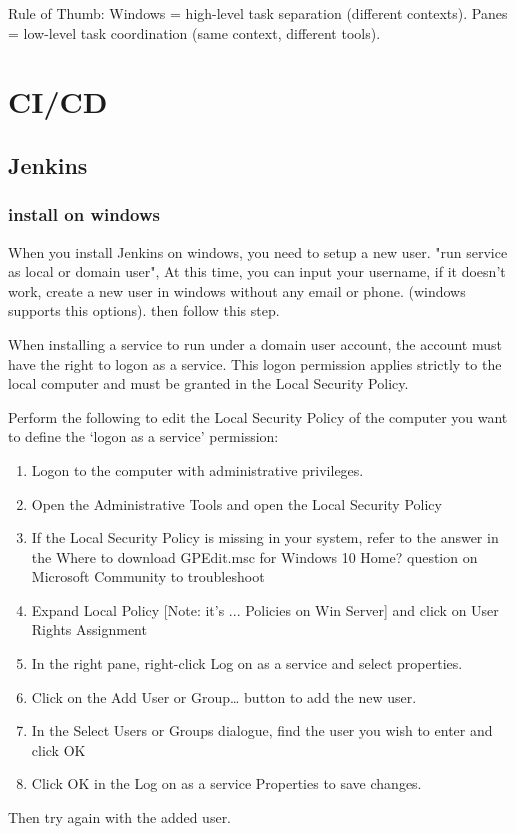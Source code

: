 \documentclass[paper=8.5in:11in, twoside, 12pt, pagesize=pdftex]{book}
\begin{document}
Rule of Thumb:
Windows = high-level task separation (different contexts). Panes = low-level task coordination (same context, different tools).


\section{CI/CD}
\subsection{Jenkins}

\subsubsection{install on windows}

When you install Jenkins on windows, you need to setup a new user. 
"run service as local or domain user", At this time, you can input your username, if it doesn't work, create a new user in windows without any email or phone. (windows supports this options). then follow this step. 


When installing a service to run under a domain user account, the account must have the right to logon as a service. This logon permission applies strictly to the local computer and must be granted in the Local Security Policy.

Perform the following to edit the Local Security Policy of the computer you want to define the ‘logon as a service’ permission:


\begin{enumerate}
	\item Logon to the computer with administrative privileges.
	
	\item Open the Administrative Tools and open the Local Security Policy
	
	\item If the Local Security Policy is missing in your system, refer to the answer in the Where to download GPEdit.msc for Windows 10 Home? question on Microsoft Community to troubleshoot
	
	\item Expand Local Policy [Note: it's ... Policies on Win Server] and click on User Rights Assignment
	
	\item In the right pane, right-click Log on as a service and select properties.
	\item Click on the Add User or Group… button to add the new user.
	
	\item In the Select Users or Groups dialogue, find the user you wish to enter and click OK
	
	\item Click OK in the Log on as a service Properties to save changes.
\end{enumerate}
Then try again with the added user.
\end{document}
